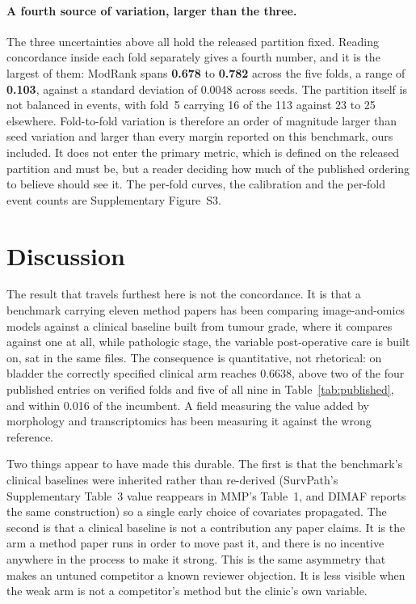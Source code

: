 \documentclass[11pt]{article}
\begin{document}
\paragraph{A fourth source of variation, larger than the three.} The three uncertainties above all
hold the released partition fixed. Reading concordance inside each fold separately gives a fourth
number, and it is the largest of them: ModRank spans \textbf{0.678} to \textbf{0.782} across the
five folds, a range of \textbf{0.103}, against a standard deviation of 0.0048 across seeds. The
partition itself is not balanced in events, with fold~5 carrying 16 of the 113 against 23 to 25
elsewhere. Fold-to-fold variation is therefore an order of magnitude larger than seed variation and
larger than every margin reported on this benchmark, ours included. It does not enter the primary
metric, which is defined on the released partition and must be, but a reader deciding how much of
the published ordering to believe should see it. The per-fold curves, the calibration and the
per-fold event counts are Supplementary Figure~S3.

\section{Discussion}

The result that travels furthest here is not the concordance. It is that a benchmark carrying
eleven method papers has been comparing image-and-omics models against a clinical baseline built
from tumour grade, where it compares against one at all, while pathologic stage, the variable post-operative care is built on, sat in the same
files. The consequence is quantitative, not rhetorical: on bladder the correctly specified clinical
arm reaches 0.6638, above two of the four published entries on verified folds and five of all
nine in Table~\ref{tab:published}, and within 0.016 of the incumbent. A field measuring the value added by
morphology and transcriptomics has been measuring it against the wrong reference.

Two things appear to have made this durable. The first is that the benchmark's clinical baselines were
inherited rather than re-derived (SurvPath's Supplementary Table~3 value reappears in MMP's Table~1, and DIMAF reports the same construction) so a single early choice of covariates
propagated. The second is that a clinical baseline is not a contribution any paper claims. It is the arm a method
paper runs in order to move past it, and there is no incentive anywhere in the process to make it
strong. This is the same asymmetry that makes an untuned competitor a known reviewer objection. It
is less visible when the weak arm is not a competitor's method but the clinic's own variable.
\end{document}
